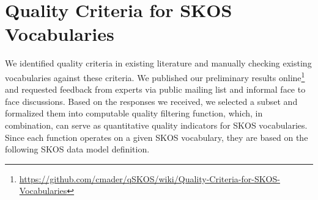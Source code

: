 
\section{Quality Criteria for SKOS Vocabularies}\label{sec:criteria}


We identified quality criteria in existing literature and manually checking existing vocabularies against these criteria. We published our preliminary results online\footnote{\url{https://github.com/cmader/qSKOS/wiki/Quality-Criteria-for-SKOS-Vocabularies}} and requested feedback from experts via public mailing list and informal face to face discussions. Based on the responses we received, we selected a subset  and formalized them into computable quality filtering function, which, in combination, can serve as quantitative quality indicators for SKOS vocabularies. Since each function operates on a given SKOS vocabulary, they are based on the following SKOS data model definition.


